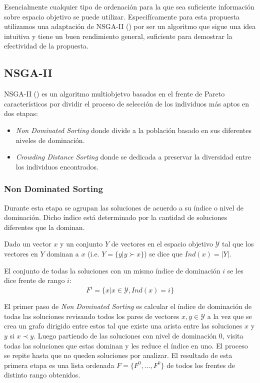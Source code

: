 Esencialmente cualquier tipo de ordenaci\'on para la que sea suficiente informaci\'on sobre espacio objetivo se puede utilizar. Especif\'icamente para esta propuesta utilizamos una adaptaci\'on de NSGA-II (\cite{deb2002fast}) por ser un algoritmo que sigue una idea intuitiva y tiene un buen rendimiento general, suficiente para demostrar la efectividad de la propuesta.

\subsection{NSGA-II}
NSGA-II (\cite{deb2002fast}) es un algoritmo multiobjetvo basados en el frente de Pareto caracter\'isticos por dividir el proceso de selecci\'on de los individuos m\'as aptos en dos etapas:
\begin{itemize}
    \item \textit{Non Dominated Sorting} donde divide a la poblaci\'on basado en sus diferentes niveles de dominaci\'on.
    \item \textit{Crowding Distance Sorting} donde se dedicada a preservar la diversidad entre los individuos encontrados. 
\end{itemize}


\subsubsection{Non Dominated Sorting}
Durante esta etapa se agrupan las soluciones de acuerdo a su \'indice o nivel de dominaci\'on. Dicho \'indice est\'a  determinado por la cantidad de soluciones diferentes que la dominan.

\begin{definition}
    \label{proposal:def:domination_index}
    Dado un vector $x$ y un conjunto $Y$ de vectores en el espacio objetivo $\mathcal{Y}$ tal que los vectores en $Y$ dominan a $x$ (i.e. $Y = \{y | y \succ x\}$) se dice que $Ind(x) = |Y|$.
\end{definition}

\begin{definition}
    \label{proposal:def:rank_front}
    El conjunto de todas la soluciones con un mismo \'indice de dominaci\'on $i$ se les dice frente de rango $i$:
    \begin{equation*}
         F^i = \{x | x \in \mathcal{Y}, Ind(x) = i\}
    \end{equation*}
\end{definition}

El primer paso de \textit{Non Dominated Sorting} es calcular el \'indice de dominaci\'on de todas las soluciones revisando todos los pares de vectores $x, y \in \mathcal{Y}$ a la vez que se crea un grafo dirigido entre estos tal que existe una arista entre las soluciones $x$ y $y$ si $x \prec y$. Luego partiendo de las soluciones con nivel de dominaci\'on 0, visita todas las soluciones que estas dominan y les reduce el \'indice en uno. El proceso se repite hasta que no queden soluciones por analizar.
El resultado de esta primera etapa es una lista ordenada  $F = \{F^0, ..., F^k\}$ de todos los frentes de distinto rango obtenidos. 

